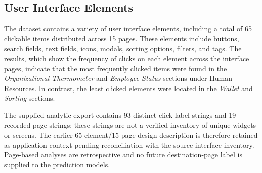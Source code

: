 \documentclass[sn-mathphys-num, Numbered]{sn-jnl}%
\theoremstyle{thmstyleone}%
\theoremstyle{thmstyletwo}%
\theoremstyle{thmstylethree}%
\providecommand{\DIFadd}[1]{{\protect\color{green!40!black}#1}} %
\providecommand{\DIFaddbegin}{} %
\providecommand{\DIFaddend}{} %
\newcommand{\DIFaddincludegraphics}[2][]{{\color{blue}\fbox{\DIFOincludegraphics[#1]{#2}}}} %
\DeclareRobustCommand{\DIFaddbegin}{\DIFOaddbegin \let\includegraphics\DIFaddincludegraphics} %
\DeclareRobustCommand{\DIFaddend}{\DIFOaddend \let\includegraphics\DIFOincludegraphics} %
\begin{document}
%

\DIFaddbegin \fi
\DIFaddend \subsection{User Interface Elements}
The dataset contains a variety of user interface elements, including a total of 65 clickable items distributed across 15 pages. These elements include buttons, search fields, text fields, icons, modals, sorting options, filters, and tags. The results, which show the frequency of clicks on each element across the interface pages, indicate that the most frequently clicked items were found in the \textit{Organizational Thermometer} and \textit{Employee Status} sections under Human Resources. In contrast, the least clicked elements were located in the \textit{Wallet} and \textit{Sorting} sections.

\DIFaddbegin \DIFadd{The supplied analytic export contains 93 distinct click-label strings and 19 recorded page strings; these strings are not a verified inventory of unique widgets or screens. The earlier 65-element/15-page design description is therefore retained as application context pending reconciliation with the source interface inventory. Page-based analyses are retrospective and no future destination-page label is supplied to the prediction models.
}



\DIFaddend %
\end{document}
